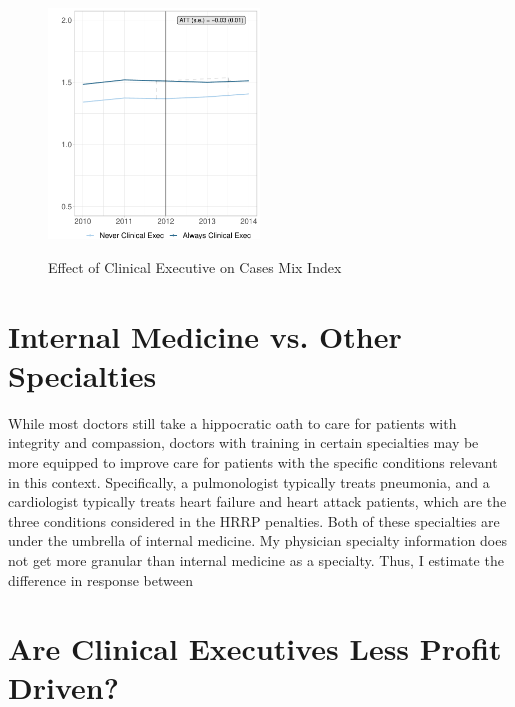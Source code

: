 \documentclass[12pt]{article}
\begin{document}
    \begin{figure}[ht!]
        \centering
        \caption{Effect of Clinical Executive on Cases Mix Index}
        \includegraphics[width=0.5\textwidth]{Objects/cmi_md_nomd_synth_graph.pdf}
        \label{fig:main_cmi_clinical}
    \end{figure}

    \section{Internal Medicine vs. Other Specialties}

    While most doctors still take a hippocratic oath to care for patients with integrity and compassion, doctors with training in certain specialties may be more equipped to improve care for patients with the specific conditions relevant in this context. Specifically, a pulmonologist typically treats pneumonia, and a cardiologist typically treats heart failure and heart attack patients, which are the three conditions considered in the HRRP penalties. Both of these specialties are under the umbrella of internal medicine. My physician specialty information does not get more granular than internal medicine as a specialty. Thus, I estimate the difference in response between 


    \section{Are Clinical Executives Less Profit Driven?}\label{sec:forprofit}
\end{document}
